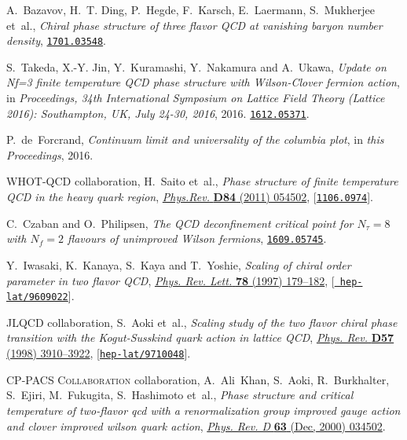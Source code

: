 \documentclass{PoS}
\begin{document}
\begin{thebibliography}{100}
A.~Bazavov, H.~T. Ding, P.~Hegde, F.~Karsch, E.~Laermann, S.~Mukherjee et~al.,
  \emph{{Chiral phase structure of three flavor QCD at vanishing baryon number
  density}},  \href{https://arxiv.org/abs/1701.03548}{{\tt 1701.03548}}.

S.~Takeda, X.-Y. Jin, Y.~Kuramashi, Y.~Nakamura and A.~Ukawa, \emph{{Update on
  Nf=3 finite temperature QCD phase structure with Wilson-Clover fermion
  action}},  in \emph{{Proceedings, 34th International Symposium on Lattice
  Field Theory (Lattice 2016): Southampton, UK, July 24-30, 2016}}, 2016.
\newblock \href{https://arxiv.org/abs/1612.05371}{{\tt 1612.05371}}.

P.~de~Forcrand, \emph{Continuum limit and universality of the columbia plot},
  in \emph{{this Proceedings}}, 2016.

{\scshape WHOT-QCD} collaboration, H.~Saito et~al., \emph{{Phase structure of
  finite temperature QCD in the heavy quark region}},
  \href{http://dx.doi.org/10.1103/PhysRevD.85.079902,
  10.1103/PhysRevD.84.054502}{\emph{Phys.Rev.} {\bf D84} (2011) 054502},
  [\href{https://arxiv.org/abs/1106.0974}{{\tt 1106.0974}}].

C.~Czaban and O.~Philipsen, \emph{{The QCD deconfinement critical point for
  $N_\tau=8$ with $N_f=2$ flavours of unimproved Wilson fermions}},
\newblock \href{https://arxiv.org/abs/1609.05745}{{\tt 1609.05745}}.

Y.~Iwasaki, K.~Kanaya, S.~Kaya and T.~Yoshie, \emph{{Scaling of chiral order
  parameter in two flavor QCD}},
  \href{http://dx.doi.org/10.1103/PhysRevLett.78.179}{\emph{Phys. Rev. Lett.}
  {\bf 78} (1997) 179--182}, [\href{https://arxiv.org/abs/hep-lat/9609022}{{\tt
  hep-lat/9609022}}].

{\scshape JLQCD} collaboration, S.~Aoki et~al., \emph{{Scaling study of the two
  flavor chiral phase transition with the Kogut-Susskind quark action in
  lattice QCD}}, \href{http://dx.doi.org/10.1103/PhysRevD.57.3910}{\emph{Phys.
  Rev.} {\bf D57} (1998) 3910--3922},
  [\href{https://arxiv.org/abs/hep-lat/9710048}{{\tt hep-lat/9710048}}].

{\scshape CP-PACS Collaboration} collaboration, A.~Ali~Khan, S.~Aoki,
  R.~Burkhalter, S.~Ejiri, M.~Fukugita, S.~Hashimoto et~al., \emph{Phase
  structure and critical temperature of two-flavor qcd with a renormalization
  group improved gauge action and clover improved wilson quark action},
  \href{http://dx.doi.org/10.1103/PhysRevD.63.034502}{\emph{Phys. Rev. D} {\bf
  63} (Dec, 2000) 034502}.


\end{thebibliography}
\end{document}
